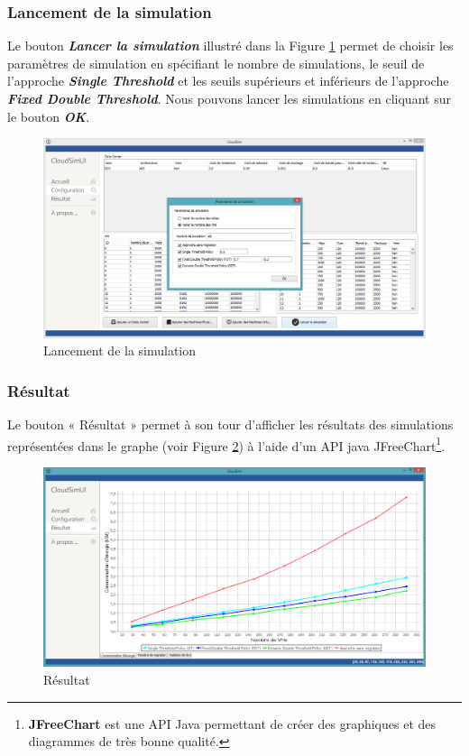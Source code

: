 \begin{onehalfspace}
\subsubsection{Lancement de la simulation}
Le bouton \textit{\textbf{Lancer la simulation}} illustré dans la Figure \ref{LDS} permet de choisir les paramètres de simulation en spécifiant le nombre de simulations, le seuil de l'approche \textit{ \textbf{Single Threshold }} et les seuils supérieurs et inférieurs de l'approche  \textit{\textbf{Fixed Double Threshold}}. Nous pouvons lancer les simulations en cliquant sur le bouton \textit{\textbf{OK}}. 
\clearpage
\begin{figure}[!h]
\begin{center}
\includegraphics[scale=0.4]{figures/inf5.png} 
\end{center}
\caption{Lancement de la simulation}
\label{LDS}
\end{figure}

\subsubsection{Résultat}
Le bouton « Résultat » permet à son tour d’afficher les résultats des simulations représentées dans le graphe (voir Figure \ref{Résultat}) à l’aide d’un API java JFreeChart\footnote{\textbf{JFreeChart} est une API Java permettant de créer des graphiques et des diagrammes de très bonne qualité.}.
\clearpage
\begin{figure}[!h]
\begin{center}
\includegraphics[scale=0.4]{figures/inf6.png} 
\end{center}
\caption{Résultat}
\label{Résultat}
\end{figure}

\end{onehalfspace}

